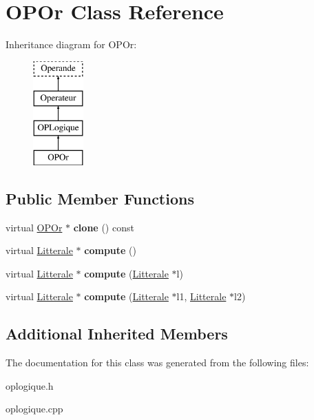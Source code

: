 \hypertarget{class_o_p_or}{}\section{O\+P\+Or Class Reference}
\label{class_o_p_or}
Inheritance diagram for O\+P\+Or\+:\begin{figure}[H]
\begin{center}
\leavevmode
\includegraphics[height=4.000000cm]{class_o_p_or}
\end{center}
\end{figure}
\subsection*{Public Member Functions}
\begin{DoxyCompactItemize}
\item 
virtual \hyperlink{class_o_p_or}{O\+P\+Or} $\ast$ {\bfseries clone} () const \hypertarget{class_o_p_or_a7d0187aebfddc4fe05b7ddae1bbceb08}{}\label{class_o_p_or_a7d0187aebfddc4fe05b7ddae1bbceb08}

\item 
virtual \hyperlink{class_litterale}{Litterale} $\ast$ {\bfseries compute} ()\hypertarget{class_o_p_or_af903164c338726e6d86d6f55300bdb08}{}\label{class_o_p_or_af903164c338726e6d86d6f55300bdb08}

\item 
virtual \hyperlink{class_litterale}{Litterale} $\ast$ {\bfseries compute} (\hyperlink{class_litterale}{Litterale} $\ast$l)\hypertarget{class_o_p_or_abbb1f72a37347f9dfaf66ecd38475905}{}\label{class_o_p_or_abbb1f72a37347f9dfaf66ecd38475905}

\item 
virtual \hyperlink{class_litterale}{Litterale} $\ast$ {\bfseries compute} (\hyperlink{class_litterale}{Litterale} $\ast$l1, \hyperlink{class_litterale}{Litterale} $\ast$l2)\hypertarget{class_o_p_or_a73ea1ffdfad3933a2a2af6f726a7ee6e}{}\label{class_o_p_or_a73ea1ffdfad3933a2a2af6f726a7ee6e}

\end{DoxyCompactItemize}
\subsection*{Additional Inherited Members}


The documentation for this class was generated from the following files\+:\begin{DoxyCompactItemize}
\item 
oplogique.\+h\item 
oplogique.\+cpp\end{DoxyCompactItemize}
